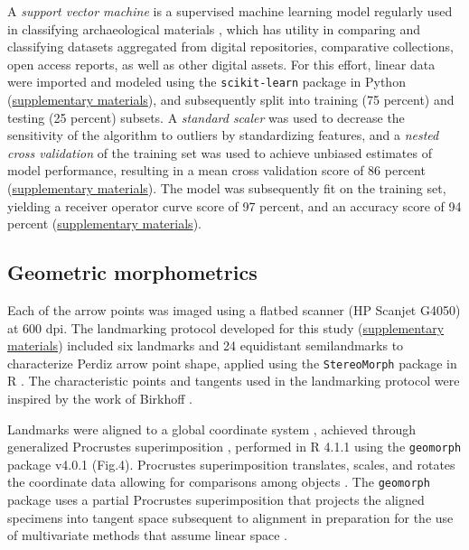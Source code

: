\documentclass[smallextended]{svjour3}       %
\begin{document}
A \emph{support vector machine} is a supervised machine learning model
regularly used in classifying archaeological materials
\cite{RN9515,RN9516,RN9514,RN9513,RN10755,RN10754}, which has utility in
comparing and classifying datasets aggregated from digital repositories,
comparative collections, open access reports, as well as other digital
assets. For this effort, linear data were imported and modeled using the
\texttt{scikit-learn} package in Python \cite{scikit-learn,sklearn_api}
(\href{https://seldenlab.github.io/perdiz3/}{supplementary materials}),
and subsequently split into training (75 percent) and testing (25
percent) subsets. A \emph{standard scaler} was used to decrease the
sensitivity of the algorithm to outliers by standardizing features, and
a \emph{nested cross validation} of the training set was used to achieve
unbiased estimates of model performance, resulting in a mean cross
validation score of 86 percent
(\href{https://seldenlab.github.io/perdiz3/}{supplementary materials}).
The model was subsequently fit on the training set, yielding a receiver
operator curve score of 97 percent, and an accuracy score of 94 percent
(\href{https://seldenlab.github.io/perdiz3/}{supplementary materials}).

\hypertarget{geometric-morphometrics}{%
\subsection{Geometric morphometrics}\label{geometric-morphometrics}}

Each of the arrow points was imaged using a flatbed scanner (HP Scanjet
G4050) at 600 dpi. The landmarking protocol developed for this study
(\href{https://seldenlab.github.io/perdiz3/}{supplementary materials})
included six landmarks and 24 equidistant semilandmarks to characterize
Perdiz arrow point shape, applied using the \texttt{StereoMorph} package
in R \cite{RN8973}. The characteristic points and tangents used in the
landmarking protocol were inspired by the work of Birkhoff
\cite{RN5700}.

Landmarks were aligned to a global coordinate system
\cite{RN8102,RN8587,RN8384}, achieved through generalized Procrustes
superimposition \cite{RN8525}, performed in R 4.1.1 \cite{RN8584} using
the \texttt{geomorph} package v4.0.1 \cite{RN8565,RN9565} (Fig.4).
Procrustes superimposition translates, scales, and rotates the
coordinate data allowing for comparisons among objects
\cite{RN5698,RN8525}. The \texttt{geomorph} package uses a partial
Procrustes superimposition that projects the aligned specimens into
tangent space subsequent to alignment in preparation for the use of
multivariate methods that assume linear space \cite{RN8511,RN8384}.
\end{document}
